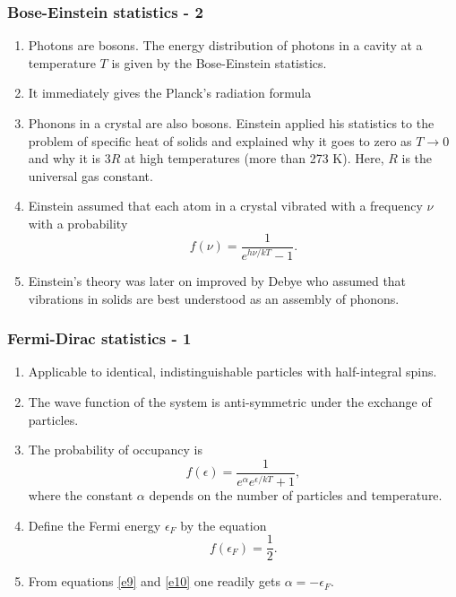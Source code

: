 \documentclass{beamer}
\begin{document}
\begin{frame}
\frametitle{Bose-Einstein statistics - 2}
\begin{enumerate}
\item Photons are bosons. The energy distribution of photons in a cavity at a
temperature $T$ is given by the Bose-Einstein statistics. 
\item It immediately gives the Planck's radiation formula
\item Phonons in a crystal are also bosons. Einstein applied his statistics to 
the problem of specific heat of solids and explained why it goes to zero as
$T \rightarrow 0$ and why it is $3R$ at high temperatures (more than 273 K).
Here, $R$ is the universal gas constant.
\item Einstein assumed that each atom in a crystal vibrated with a frequency
$\nu$ with a probability
\begin{equation}\label{e8}
f(\nu) = \frac{1}{e^{h\nu/kT} - 1}.
\end{equation}
\item Einstein's theory was later on improved by Debye who assumed that 
vibrations in solids are best understood as an assembly of phonons.
\end{enumerate}
\end{frame}

\begin{frame}
\frametitle{Fermi-Dirac statistics - 1}
\begin{enumerate}
\item Applicable to identical, indistinguishable particles with half-integral 
spins.
\item The wave function of the system is anti-symmetric under the exchange of 
particles.
\item The probability of occupancy is
\begin{equation}\label{e9}
f(\epsilon) = \frac{1}{e^\alpha e^{\epsilon/kT} + 1},
\end{equation}
where the constant $\alpha$ depends on the number of particles and temperature.
\item Define the Fermi energy $\epsilon_F$ by the equation
\begin{equation}\label{e10}
f(\epsilon_F) = \frac{1}{2}.
\end{equation}
\item From equations \eqref{e9} and \eqref{e10} one readily gets $\alpha = 
-\epsilon_F$.
\end{enumerate}
\end{frame}
\end{document}
